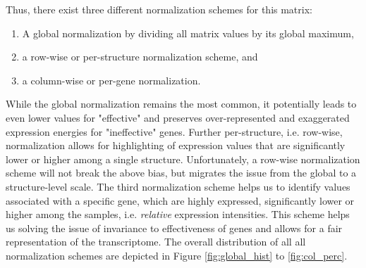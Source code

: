 \documentclass[]{article}
\begin{document}
Thus, there exist three different normalization schemes for this matrix: 
\begin{enumerate}
	\item A global normalization by dividing all matrix values by its global maximum, 
	\item a row-wise or per-structure normalization scheme, and
	\item a column-wise or per-gene normalization.
\end{enumerate}

While the global normalization remains the most common, it potentially leads to even lower values for "effective" and preserves over-represented and exaggerated expression energies for "ineffective" genes.
Further per-structure, i.e. row-wise, normalization allows for highlighting of expression values that are significantly lower or higher among a single structure. Unfortunately, a row-wise normalization scheme will not break the above bias, but migrates the issue from the global to a structure-level scale. The third normalization scheme helps us to identify values associated with a specific gene, which are highly expressed, significantly lower or higher among the samples, i.e. \textit{relative} expression intensities. This scheme helps us solving the issue of invariance to effectiveness of genes and allows for a fair representation of the transcriptome. The overall distribution of all all normalization schemes are depicted in Figure \ref{fig:global_hist} to \ref{fig:col_perc}.\\
\end{document}
